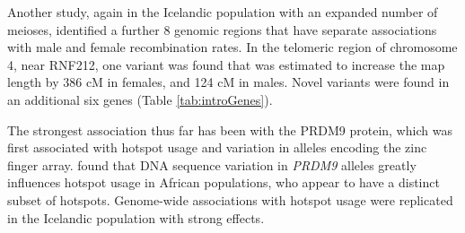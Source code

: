 Another study, again in the Icelandic population with an expanded number of meioses, identified a further 8 genomic regions that have separate associations with male and female recombination rates\cite{Kong2014}.
In the telomeric region of chromosome 4, near RNF212, one variant was found that was estimated to increase the map length by 386 cM in females, and 124 cM in males.
Novel variants were found in an additional six genes (Table \ref{tab:introGenes}).

The strongest association thus far has been with the PRDM9 protein, which was first associated with hotspot usage and variation in alleles encoding the zinc finger array\cite{Baudat2010,Berg2010}.
\citet{Berg2011} found that DNA sequence variation in \textit{PRDM9} alleles greatly influences hotspot usage in African populations, who appear to have a distinct subset of hotspots\cite{Hinch2011}.
Genome-wide associations with hotspot usage were replicated in the Icelandic population with strong effects\cite{Kong2010}.

